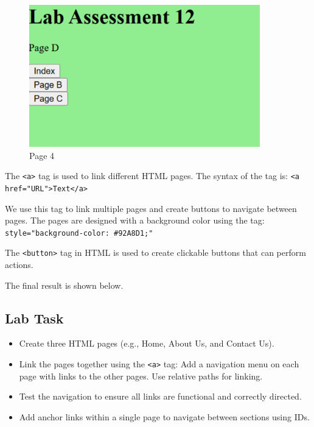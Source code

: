 \documentclass[a4paper,9pt]{article}
\begin{document}
\begin{enumerate}
	\begin{figure}[H]
		\centering
		\includegraphics[width=0.8\linewidth]{10.4.png}
		\caption{Page 4}
	\end{figure}
	
	The \texttt{\textless a\textgreater} tag is used to link different HTML pages. The syntax of the tag is:  
	\texttt{\textless a href="URL"\textgreater Text\textless /a\textgreater}  
	
	We use this tag to link multiple pages and create buttons to navigate between pages. The pages are designed with a background color using the tag:  
	\texttt{style="background-color: \#92A8D1;"}  
	
	The \texttt{\textless button\textgreater} tag in HTML is used to create clickable buttons that can perform actions.  
	
	The final result is shown below.
	
	
	
\end{enumerate}

\subsection{Lab Task}

\begin{itemize}
	\item Create three HTML pages (e.g., Home, About Us, and Contact Us).
	\item Link the pages together using the \texttt{\textless a\textgreater} tag:
	Add a navigation menu on each page with links to the other pages.
	Use relative paths for linking.
	\item Test the navigation to ensure all links are functional and correctly directed.
	\item Add anchor links within a single page to navigate between sections using IDs.
\end{itemize}
\end{document}
